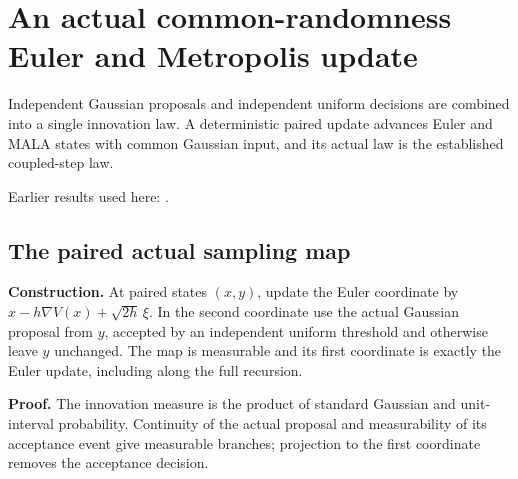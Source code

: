 \documentclass[11pt,a4paper]{report}
\begin{document}
\section{\texorpdfstring{An actual common-randomness Euler and Metropolis update}{An actual common-randomness Euler and Metropolis update}}
\label{proof-module-WassersteinMixing-SemigroupRandomMALA-lean}


Independent Gaussian proposals and independent uniform decisions are combined into a single innovation law. A deterministic paired update advances Euler and MALA states with common Gaussian input, and its actual law is the established coupled-step law.



Earlier results used here: \cite[Section~3.33]{LangevinLean2026ULASC}.
\subsection{\texorpdfstring{The paired actual sampling map}{The paired actual sampling map}}
\label{report-step-WassersteinMixing-SemigroupRandomMALA-lean-1}


\textbf{Construction.} At paired states \((x,y)\), update the Euler coordinate by \(x-h\nabla V(x)+\sqrt{2h}\,\xi\). In the second coordinate use the actual Gaussian proposal from \(y\), accepted by an independent uniform threshold and otherwise leave \(y\) unchanged. The map is measurable and its first coordinate is exactly the Euler update, including along the full recursion.



\textbf{Proof.} The innovation measure is the product of standard Gaussian and unit-interval probability. Continuity of the actual proposal and measurability of its acceptance event give measurable branches; projection to the first coordinate removes the acceptance decision.
\end{document}
